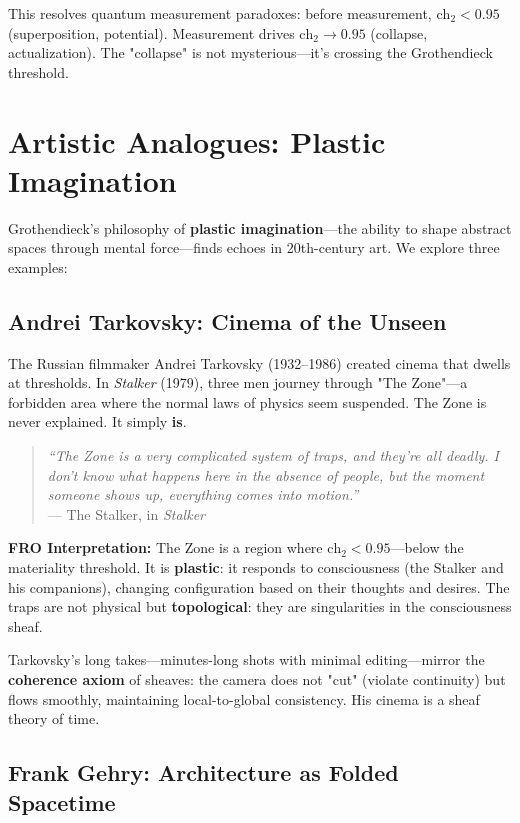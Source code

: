 This resolves quantum measurement paradoxes: before measurement, $\text{ch}_2 < 0.95$ (superposition, potential). Measurement drives $\text{ch}_2 \to 0.95$ (collapse, actualization). The "collapse" is not mysterious—it's crossing the Grothendieck threshold.

\section{Artistic Analogues: Plastic Imagination}

Grothendieck's philosophy of \textbf{plastic imagination}—the ability to shape abstract spaces through mental force—finds echoes in 20th-century art. We explore three examples:

\subsection{Andrei Tarkovsky: Cinema of the Unseen}

The Russian filmmaker Andrei Tarkovsky (1932–1986) created cinema that dwells at thresholds. In \textit{Stalker} (1979), three men journey through "The Zone"—a forbidden area where the normal laws of physics seem suspended. The Zone is never explained. It simply \textbf{is}.

\begin{quote}
\textit{``The Zone is a very complicated system of traps, and they're all deadly. I don't know what happens here in the absence of people, but the moment someone shows up, everything comes into motion.''}\\
\hspace*{\fill} --- The Stalker, in \textit{Stalker}
\end{quote}

\textbf{FRO Interpretation:} The Zone is a region where $\text{ch}_2 < 0.95$—below the materiality threshold. It is \textbf{plastic}: it responds to consciousness (the Stalker and his companions), changing configuration based on their thoughts and desires. The traps are not physical but \textbf{topological}: they are singularities in the consciousness sheaf.

Tarkovsky's long takes—minutes-long shots with minimal editing—mirror the \textbf{coherence axiom} of sheaves: the camera does not "cut" (violate continuity) but flows smoothly, maintaining local-to-global consistency. His cinema is a sheaf theory of time.

\subsection{Frank Gehry: Architecture as Folded Spacetime}


